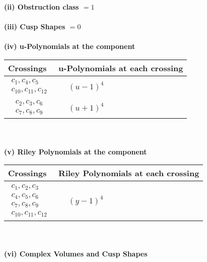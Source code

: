\documentclass[1p]{elsarticle_modified}
\theoremstyle{definition}
\begin{document}
\flushleft \textbf{(ii) Obstruction class $= 1$}\\~\\
\flushleft \textbf{(iii) Cusp Shapes $= 0$}\\~\\
\newpage\renewcommand{\arraystretch}{1}
\flushleft \textbf{(iv) u-Polynomials at the component}\newline \\
\begin{tabular}{m{50pt}|m{274pt}}
Crossings & \hspace{64pt}u-Polynomials at each crossing \\
\hline $$\begin{aligned}c_{1},c_{4},c_{5}\\c_{10},c_{11},c_{12}\end{aligned}$$&$\begin{aligned}
&(u-1)^4
\end{aligned}$\\
\hline $$\begin{aligned}c_{2},c_{3},c_{6}\\c_{7},c_{8},c_{9}\end{aligned}$$&$\begin{aligned}
&(u+1)^4
\end{aligned}$\\
\hline
\end{tabular}\\~\\
\newpage\renewcommand{\arraystretch}{1}
\flushleft \textbf{(v) Riley Polynomials at the component}\newline \\
\begin{tabular}{m{50pt}|m{274pt}}
Crossings & \hspace{64pt}Riley Polynomials at each crossing \\
\hline $$\begin{aligned}c_{1},c_{2},c_{3}\\c_{4},c_{5},c_{6}\\c_{7},c_{8},c_{9}\\c_{10},c_{11},c_{12}\end{aligned}$$&$\begin{aligned}
&(y-1)^4
\end{aligned}$\\
\hline
\end{tabular}\\~\\
\newpage\flushleft \textbf{(vi) Complex Volumes and Cusp Shapes}
\end{document}
